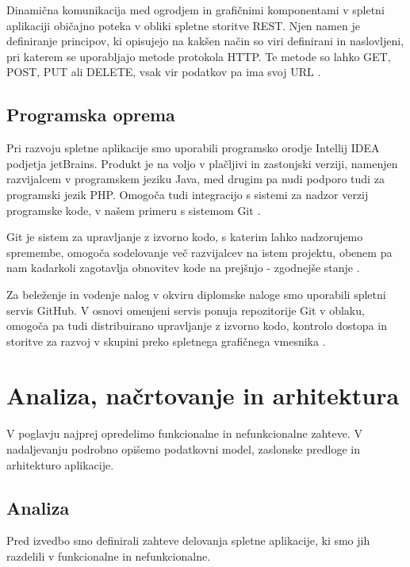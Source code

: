 \documentclass[a4paper, 12pt]{book}
\begin{document}
Dinamična komunikacija med ogrodjem in grafičnimi komponentami v spletni aplikaciji običajno poteka v obliki spletne storitve REST. Njen namen je definiranje principov, ki opisujejo na kakšen način so viri definirani in naslovljeni, pri katerem se uporabljajo metode protokola HTTP. Te metode so lahko GET, POST, PUT ali DELETE, vsak vir podatkov pa ima svoj URL \cite{protokol-rest}.


\section{Programska oprema}

Pri razvoju spletne aplikacije smo uporabili programsko orodje Intellij IDEA podjetja jetBrains. Produkt je na voljo v plačljivi in zastonjski verziji, namenjen razvijalcem v programskem jeziku Java, med drugim pa nudi podporo tudi za programski jezik PHP. Omogoča tudi integracijo s sistemi za nadzor verzij programske kode, v našem primeru s sistemom Git \cite{intellij-idea}.

Git je sistem za upravljanje z izvorno kodo, s katerim lahko nadzorujemo spremembe, omogoča sodelovanje več razvijalcev na istem projektu, obenem pa nam kadarkoli zagotavlja obnovitev kode na prejšnjo - zgodnejše stanje \cite{sistem-git}.

Za beleženje in vodenje nalog v okviru diplomske naloge smo uporabili spletni servis GitHub. V osnovi omenjeni servis ponuja repozitorije Git v oblaku, omogoča pa tudi distribuirano upravljanje z izvorno kodo, kontrolo dostopa in storitve za razvoj v skupini preko spletnega grafičnega vmesnika \cite{github}.



\chapter{Analiza, načrtovanje in arhitektura}
\label{analiza-nacrtovanje-arhitektura}

V poglavju najprej opredelimo funkcionalne in nefunkcionalne zahteve. V nadaljevanju podrobno opišemo podatkovni model, zaslonske predloge in arhitekturo aplikacije.


\section{Analiza}

Pred izvedbo smo definirali zahteve delovanja spletne aplikacije, ki smo jih razdelili v funkcionalne in nefunkcionalne.
\end{document}
